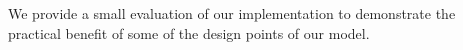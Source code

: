 We provide a small evaluation of our implementation to demonstrate the
practical benefit of some of the design points of our model.
